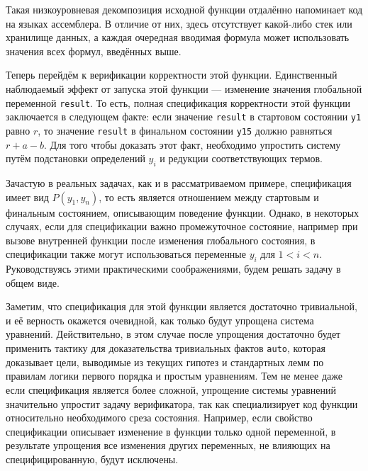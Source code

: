 \documentclass[../thesis.tex]{subfiles}
\begin{document}
Такая низкоуровневая декомпозиция исходной функции отдалённо напоминает код на языках ассемблера. В отличие от них, здесь отсутствует какой-либо стек или хранилище данных, а каждая очередная вводимая формула может использовать значения всех формул, введённых выше.

Теперь перейдём к верификации корректности этой функции. Единственный наблюдаемый эффект от запуска этой функции --- изменение значения глобальной переменной \texttt{result}. То есть, полная спецификация корректности этой функции заключается в следующем факте: если значение \texttt{result} в стартовом состоянии \texttt{y1} равно $r$, то значение \texttt{result} в финальном состоянии \texttt{y15} должно равняться $r + a - b$. Для того чтобы доказать этот факт, необходимо упростить систему путём подстановки определений $y_i$ и редукции соответствующих термов.

\bigskip


\bigskip

Зачастую в реальных задачах, как и в рассматриваемом примере, спецификация имеет вид $P(y_1, y_n)$, то есть является отношением между стартовым и финальным состоянием, описывающим поведение функции. Однако, в некоторых случаях, если для спецификации важно промежуточное состояние, например при вызове внутренней функции после изменения глобального состояния, в спецификации также могут использоваться переменные $y_i$ для $1 < i < n$. Руководствуясь этими практическими соображениями, будем решать задачу в общем виде.

Заметим, что спецификация для этой функции является достаточно тривиальной, и её верность окажется очевидной, как только будут упрощена система уравнений. Действительно, в этом случае после упрощения достаточно будет применить тактику для доказательства тривиальных фактов \texttt{auto}, которая доказывает цели, выводимые из текущих гипотез и стандартных лемм по правилам логики первого порядка и простым уравнениям. Тем не менее даже если спецификация является более сложной, упрощение системы уравнений значительно упростит задачу верификатора, так как специализирует код функции относительно необходимого среза состояния. Например, если свойство спецификации описывает изменение в функции только одной переменной, в результате упрощения все изменения других переменных, не влияющих на специфицированную, будут исключены.
\end{document}
